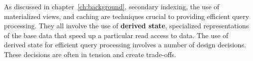 




As discussed in chapter~\ref{ch:background}, secondary indexing, the use of materialized views, and caching are techniques
crucial to providing efficient query processing.
They all involve the use of \textbf{derived state}, specialized representations of the base data that speed up a
particular read access to data.
The use of derived state for efficient query processing involves a number of design decisions.
These decisions are often in tension and create trade-offs.

